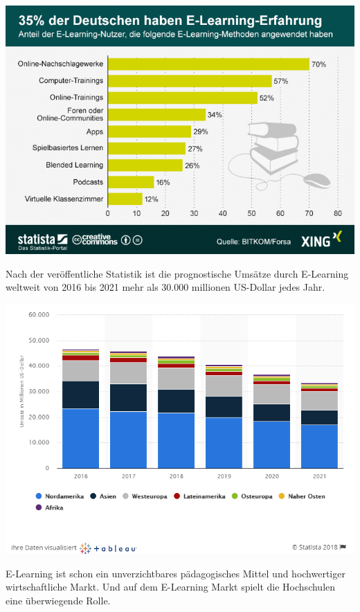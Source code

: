 \includegraphics[width=\textwidth]{images/eLearningErfahrung.png}

Nach der veröffentliche Statistik ist die prognostische Umsätze durch E-Learning weltweit von 2016 bis 2021 mehr als 30.000 millionen US-Dollar jedes Jahr.

\includegraphics[width=\textwidth]{images/umsatzDiagnose.png}

E-Learning ist schon ein unverzichtbares pädagogisches Mittel und hochwertiger wirtschaftliche Markt. Und auf dem E-Learning Markt spielt die Hochschulen eine überwiegende Rolle.

